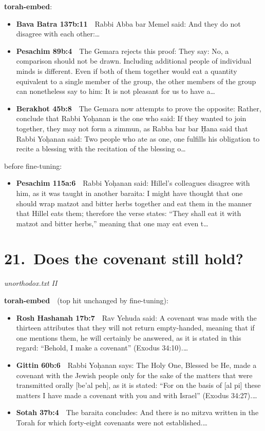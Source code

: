 \documentclass[11pt,a4paper]{article}
\begin{document}
{\color{quiet}\small\textbf{torah-embed}:}
\begin{itemize}[leftmargin=1.2em,itemsep=3pt]
\item {\color{ref}\textbf{Bava Batra 137b:11}}\ \ Rabbi Abba bar Memel said: And they do not disagree with each other:\ldots
\item {\color{ref}\textbf{Pesachim 89b:4}}\ \ The Gemara rejects this proof: They say: No, a comparison should not be drawn. Including additional people of individual minds is different. Even if both of them together would eat a quantity equivalent to a single member of the group, the other members of the group can nonetheless say to him: It is not pleasant for us to have a\ldots
\item {\color{ref}\textbf{Berakhot 45b:8}}\ \ The Gemara now attempts to prove the opposite: Rather, conclude that Rabbi Yoḥanan is the one who said: If they wanted to join together, they may not form a zimmun, as Rabba bar bar Ḥana said that Rabbi Yoḥanan said: Two people who ate as one, one fulfills his obligation to recite a blessing with the recitation of the blessing o\ldots
\end{itemize}
{\color{quiet}\small before fine-tuning:}
\begin{itemize}[leftmargin=1.2em]
\item {\color{ref}\textbf{Pesachim 115a:6}}\ \ Rabbi Yoḥanan said: Hillel’s colleagues disagree with him, as it was taught in another baraita: I might have thought that one should wrap matzot and bitter herbs together and eat them in the manner that Hillel eats them; therefore the verse states: “They shall eat it with matzot and bitter herbs,” meaning that one may eat even t\ldots
\end{itemize}

\section*{21.\ Does the covenant still hold?}
{\color{quiet}\small\textit{unorthodox.txt II}}

{\color{quiet}\small\textbf{torah-embed}\ \ (top hit unchanged by fine-tuning):}
\begin{itemize}[leftmargin=1.2em,itemsep=3pt]
\item {\color{ref}\textbf{Rosh Hashanah 17b:7}}\ \ Rav Yehuda said: A covenant was made with the thirteen attributes that they will not return empty-handed, meaning that if one mentions them, he will certainly be answered, as it is stated in this regard: “Behold, I make a covenant” (Exodus 34:10).\ldots
\item {\color{ref}\textbf{Gittin 60b:6}}\ \ Rabbi Yoḥanan says: The Holy One, Blessed be He, made a covenant with the Jewish people only for the sake of the matters that were transmitted orally [be’al peh], as it is stated: “For on the basis of [al pi] these matters I have made a covenant with you and with Israel” (Exodus 34:27).\ldots
\item {\color{ref}\textbf{Sotah 37b:4}}\ \ The baraita concludes: And there is no mitzva written in the Torah for which forty-eight covenants were not established.\ldots
\end{itemize}
\end{document}
